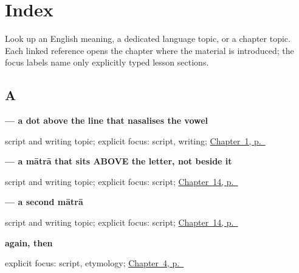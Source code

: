 
\chapter*{Index}

Look up an English meaning, a dedicated language topic, or a chapter topic. Each linked reference opens the chapter where the material is introduced; the focus labels name only explicitly typed lesson sections.

\section*{A}

\noindent\begin{minipage}[t]{\linewidth}
\raggedright
\textbf{ — a dot above the line that nasalises the vowel}\par
\footnotesize script and writing topic; explicit focus: script, writing; \hyperref[ch:greetings]{Chapter~1, p.~\pageref*{ch:greetings}}
\end{minipage}\par\smallskip

\noindent\begin{minipage}[t]{\linewidth}
\raggedright
\textbf{ — a mātrā that sits ABOVE the letter, not beside it}\par
\footnotesize script and writing topic; explicit focus: script; \hyperref[ch:pa-script-first]{Chapter~14, p.~\pageref*{ch:pa-script-first}}
\end{minipage}\par\smallskip

\noindent\begin{minipage}[t]{\linewidth}
\raggedright
\textbf{ — a second mātrā}\par
\footnotesize script and writing topic; explicit focus: script; \hyperref[ch:pa-script-first]{Chapter~14, p.~\pageref*{ch:pa-script-first}}
\end{minipage}\par\smallskip

\noindent\begin{minipage}[t]{\linewidth}
\raggedright
\textbf{again, then}\enspace\emph{}\par
\footnotesize explicit focus: script, etymology; \hyperref[ch:farewells]{Chapter~4, p.~\pageref*{ch:farewells}}
\end{minipage}\par\smallskip

